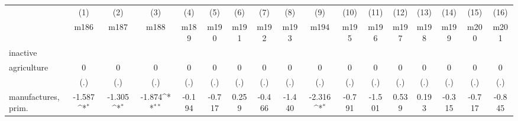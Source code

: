 {
\def\sym#1{\ifmmode^{#1}\else\(^{#1}\)\fi}
\begin{tabular}{l*{16}{c}}
\hline\hline
                    &\multicolumn{1}{c}{(1)}&\multicolumn{1}{c}{(2)}&\multicolumn{1}{c}{(3)}&\multicolumn{1}{c}{(4)}&\multicolumn{1}{c}{(5)}&\multicolumn{1}{c}{(6)}&\multicolumn{1}{c}{(7)}&\multicolumn{1}{c}{(8)}&\multicolumn{1}{c}{(9)}&\multicolumn{1}{c}{(10)}&\multicolumn{1}{c}{(11)}&\multicolumn{1}{c}{(12)}&\multicolumn{1}{c}{(13)}&\multicolumn{1}{c}{(14)}&\multicolumn{1}{c}{(15)}&\multicolumn{1}{c}{(16)}\\
                    &\multicolumn{1}{c}{m186}&\multicolumn{1}{c}{m187}&\multicolumn{1}{c}{m188}&\multicolumn{1}{c}{m189}&\multicolumn{1}{c}{m190}&\multicolumn{1}{c}{m191}&\multicolumn{1}{c}{m192}&\multicolumn{1}{c}{m193}&\multicolumn{1}{c}{m194}&\multicolumn{1}{c}{m195}&\multicolumn{1}{c}{m196}&\multicolumn{1}{c}{m197}&\multicolumn{1}{c}{m198}&\multicolumn{1}{c}{m199}&\multicolumn{1}{c}{m200}&\multicolumn{1}{c}{m201}\\
\hline
inactive            &                     &                     &                     &                     &                     &                     &                     &                     &                     &                     &                     &                     &                     &                     &                     &                     \\
agriculture         &           0         &           0         &           0         &           0         &           0         &           0         &           0         &           0         &           0         &           0         &           0         &           0         &           0         &           0         &           0         &           0         \\
                    &         (.)         &         (.)         &         (.)         &         (.)         &         (.)         &         (.)         &         (.)         &         (.)         &         (.)         &         (.)         &         (.)         &         (.)         &         (.)         &         (.)         &         (.)         &         (.)         \\
[1em]
manufactures, prim. &      -1.587\sym{*}  &      -1.305\sym{*}  &      -1.874\sym{**} &      -0.194         &      -0.717         &       0.259         &      -0.466         &      -1.440         &      -2.316\sym{*}  &      -0.791         &      -1.501         &       0.539         &       0.193         &      -0.315         &      -0.717         &      -0.845         \\

\end{tabular}}
